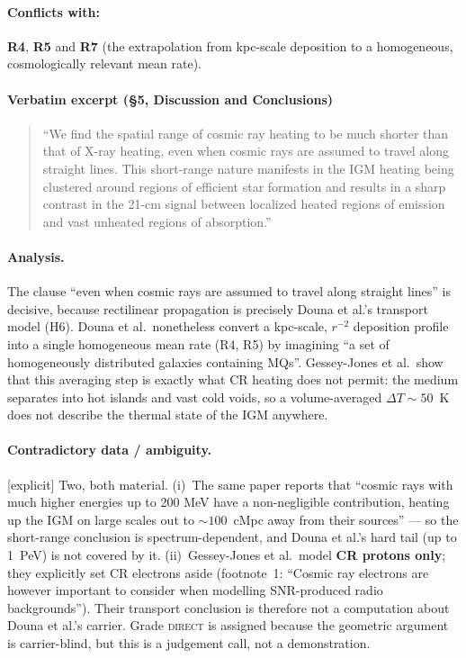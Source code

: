 \documentclass[11pt,a4paper]{article}
\newcommand{\flag}[1]{\textcolor{orange!75!black}{\textsf{\small [#1]}}}
\begin{document}
\paragraph{Conflicts with:} \textbf{R4}, \textbf{R5} and \textbf{R7} (the
extrapolation from kpc-scale deposition to a homogeneous, cosmologically
relevant mean rate).

\paragraph{Verbatim excerpt (\S5, Discussion and Conclusions)}
\begin{quote}\small
``We find the spatial range of cosmic ray heating to be much shorter than that
of X-ray heating, even when cosmic rays are assumed to travel along straight
lines. This short-range nature manifests in the IGM heating being clustered
around regions of efficient star formation and results in a sharp contrast in
the 21-cm signal between localized heated regions of emission and vast unheated
regions of absorption.''
\end{quote}

\paragraph{Analysis.}
The clause ``even when cosmic rays are assumed to travel along straight lines''
is decisive, because rectilinear propagation is precisely Douna et al.'s
transport model (H6). Douna et al.\ nonetheless convert a kpc-scale, $r^{-2}$
deposition profile into a single homogeneous mean rate (R4, R5) by imagining
``a set of homogeneously distributed galaxies containing MQs''. Gessey-Jones
et al.\ show that this averaging step is exactly what CR heating does not
permit: the medium separates into hot islands and vast cold voids, so a
volume-averaged $\Delta T\sim50$~K does not describe the thermal state of the
IGM anywhere.

\paragraph{Contradictory data / ambiguity.} \flag{explicit}
Two, both material.
(i)~The same paper reports that ``cosmic rays with much higher energies up to
200 MeV have a non-negligible contribution, heating up the IGM on large scales
out to $\sim100$~cMpc away from their sources'' --- so the short-range
conclusion is spectrum-dependent, and Douna et al.'s hard tail (up to 1~PeV)
is not covered by it.
(ii)~Gessey-Jones et al.\ model \textbf{CR protons only}; they explicitly set
CR electrons aside (footnote~1: ``Cosmic ray electrons are however important to
consider when modelling SNR-produced radio backgrounds''). Their transport
conclusion is therefore not a computation about Douna et al.'s carrier. Grade
\textsc{direct} is assigned because the geometric argument is carrier-blind,
but this is a judgement call, not a demonstration.
\end{document}
